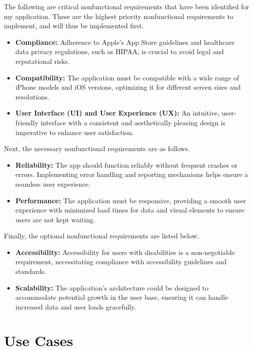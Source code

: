 The following are critical nonfunctional requirements that have been identified for my application. These are the highest priority nonfunctional requirements to implement, and will thus be implemented first.

\begin{itemize}
    \item \textbf{Compliance:} Adherence to Apple's App Store guidelines and healthcare data privacy regulations, such as HIPAA, is crucial to avoid legal and reputational risks.
    \item \textbf{Compatibility:} The application must be compatible with a wide range of iPhone models and iOS versions, optimizing it for different screen sizes and resolutions.
    \item \textbf{User Interface (UI) and User Experience (UX):} An intuitive, user-friendly interface with a consistent and aesthetically pleasing design is imperative to enhance user satisfaction.
\end{itemize}

Next, the necessary nonfunctional requirements are as follows.

\begin{itemize}
    \item \textbf{Reliability:} The app should function reliably without frequent crashes or errors. Implementing error handling and reporting mechanisms helps ensure a seamless user experience.
    \item \textbf{Performance:} The application must be responsive, providing a smooth user experience with minimized load times for data and visual elements to ensure users are not kept waiting.
\end{itemize}

Finally, the optional nonfunctional requirements are listed below.

\begin{itemize}
    \item \textbf{Accessibility:} Accessibility for users with disabilities is a non-negotiable requirement, necessitating compliance with accessibility guidelines and standards.
    \item \textbf{Scalability:} The application's architecture could be designed to accommodate potential growth in the user base, ensuring it can handle increased data and user loads gracefully.
\end{itemize}

\section{Use Cases}

